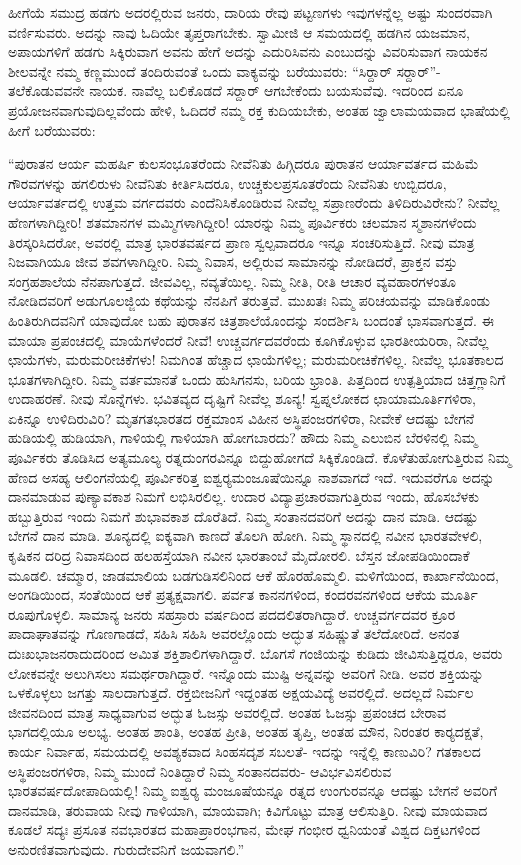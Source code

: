 ಹೀಗೆಯೆ ಸಮುದ್ರ ಹಡಗು ಅದರಲ್ಲಿರುವ ಜನರು, ದಾರಿಯ ರೇವು ಪಟ್ಟಣಗಳು ಇವುಗಳನ್ನೆಲ್ಲ ಅಷ್ಟು ಸುಂದರವಾಗಿ ವರ್ಣಿಸುವರು. ಅದನ್ನು ನಾವು ಓದಿಯೇ ತೃಪ್ತರಾಗಬೇಕು. ಸ್ವಾಮೀಜಿ ಆ ಸಮಯದಲ್ಲಿ ಹಡಗಿನ ಯಜಮಾನ, ಅಪಾಯಗಳಿಗೆ ಹಡಗು ಸಿಕ್ಕಿರುವಾಗ ಅವನು ಹೇಗೆ ಅದನ್ನು ಎದುರಿಸಿವನು ಎಂಬುದನ್ನು ವಿವರಿಸುವಾಗ ನಾಯಕನ ಶೀಲವನ್ನೇ ನಮ್ಮ ಕಣ್ಣಮುಂದೆ ತಂದಿರುವಂತೆ ಒಂದು ವಾಕ್ಯವನ್ನು ಬರೆಯುವರು: “ಸಿರ್‍ದಾರ್ ಸರ್‍ದಾರ್”- ತಲೆಕೊಡುವವನೇ ನಾಯಕ. ನಾವೆಲ್ಲ ಬಲಿಕೊಡದೆ ಸರ್‍ದಾರ್ ಆಗಬೇಕೆಂದು ಬಯಸುವೆವು. ಇದರಿಂದ ಏನೂ ಪ್ರಯೋಜನವಾಗುವುದಿಲ್ಲವೆಂದು ಹೇಳಿ, ಓದಿದರೆ ನಮ್ಮ ರಕ್ತ ಕುದಿಯಬೇಕು, ಅಂತಹ ಜ್ವಾಲಾಮಯವಾದ ಭಾಷೆಯಲ್ಲಿ ಹೀಗೆ ಬರೆಯುವರು: 

 “ಪುರಾತನ ಆರ್ಯ ಮಹರ್ಷಿ ಕುಲಸಂಭೂತರೆಂದು ನೀವೆನಿತು ಹಿಗ್ಗಿದರೂ ಪುರಾತನ ಆರ್ಯಾವರ್ತದ ಮಹಿಮೆ ಗೌರವಗಳನ್ನು ಹಗಲಿರುಳು ನೀವೆನಿತು ಕೀರ್ತಿಸಿದರೂ, ಉಚ್ಚಕುಲಪ್ರಸೂತರೆಂದು ನೀವೆನಿತು ಉಬ್ಬಿದರೂ, ಆರ್ಯಾವರ್ತದಲ್ಲಿ ಉತ್ತಮ ವರ್ಗದವರು ಎಂದೆನಿಸಿಕೊಂಡಿರುವ ನೀವೆಲ್ಲ ಸಪ್ರಾಣರೆಂದು ತಿಳಿದಿರುವಿರೇನು? ನೀವೆಲ್ಲ ಹೆಣಗಳಾಗಿದ್ದೀರಿ! ಶತಮಾನಗಳ ಮಮ್ಮಿಗಳಾಗಿದ್ದೀರಿ! ಯಾರನ್ನು ನಿಮ್ಮ ಪೂರ್ವಿಕರು ಚಲಮಾನ ಸ್ಮಶಾನಗಳೆಂದು ತಿರಸ್ಕರಿಸಿದರೋ, ಅವರಲ್ಲಿ ಮಾತ್ರ ಭಾರತವರ್ಷದ ಪ್ರಾಣ ಸ್ವಲ್ಪವಾದರೂ ಇನ್ನೂ ಸಂಚರಿಸುತ್ತಿದೆ. ನೀವು ಮಾತ್ರ ನಿಜವಾಗಿಯೂ ಜೀವ ಶವಗಳಾಗಿದ್ದೀರಿ. ನಿಮ್ಮ ನಿವಾಸ, ಅಲ್ಲಿರುವ ಸಾಮಾನನ್ನು ನೋಡಿದರೆ, ಪ್ರಾಕ್ತನ ವಸ್ತು ಸಂಗ್ರಹಶಾಲೆಯ ನೆನಪಾಗುತ್ತದೆ. ಜೀವವಿಲ್ಲ, ನವ್ಯತೆಯಿಲ್ಲ. ನಿಮ್ಮ ನೀತಿ, ರೀತಿ ಆಚಾರ ವ್ಯವಹಾರಗಳಂತೂ ನೋಡಿದವರಿಗೆ ಅಡುಗೂಲಜ್ಜಿಯ ಕಥೆಯನ್ನು ನೆನಪಿಗೆ ತರುತ್ತವೆ. ಮುಖತಃ ನಿಮ್ಮ ಪರಿಚಯವನ್ನು ಮಾಡಿಕೊಂಡು ಹಿಂತಿರುಗಿದವನಿಗೆ ಯಾವುದೋ ಬಹು ಪುರಾತನ ಚಿತ್ರಶಾಲೆಯೊಂದನ್ನು ಸಂದರ್ಶಿಸಿ ಬಂದಂತೆ ಭಾಸವಾಗುತ್ತದೆ. ಈ ಮಾಯಾ ಪ್ರಪಂಚದಲ್ಲಿ ಮಾಯೆಗಳೆಂದರೆ ನೀವೆ! ಉಚ್ಚವರ್ಗದವರೆಂದು ಕೂಗಿಕೊಳ್ಳುವ ಭಾರತೀಯರಿರಾ, ನೀವೆಲ್ಲ ಛಾಯೆಗಳು, ಮರುಮರೀಚಿಕೆಗಳು! ನಿಮಗಿಂತ ಹೆಚ್ಚಾದ ಛಾಯೆಗಳಿಲ್ಲ; ಮರುಮರೀಚಿಕೆಗಳಿಲ್ಲ. ನೀವೆಲ್ಲ ಭೂತಕಾಲದ ಭೂತಗಳಾಗಿದ್ದೀರಿ. ನಿಮ್ಮ ವರ್ತಮಾನತೆ ಒಂದು ಹುಸಿಗನಸು, ಬರಿಯ ಭ್ರಾಂತಿ. ಪಿತ್ತದಿಂದ ಉತ್ಪತ್ತಿಯಾದ ಚಿತ್ತಗ್ಲಾನಿಗೆ ಉದಾಹರಣೆ. ನೀವು ಸೊನ್ನೆಗಳು. ಭವಿತವ್ಯದ ದೃಷ್ಟಿಗೆ ನೀವೆಲ್ಲ ಶೂನ್ಯ! ಸ್ವಪ್ನಲೋಕದ ಛಾಯಾಮೂರ್ತಿಗಳಿರಾ, ಏಕಿನ್ನೂ ಉಳಿದಿರುವಿರಿ? ಮೃತಗತಭಾರತದ ರಕ್ತಮಾಂಸ ವಿಹೀನ ಅಸ್ಥಿಪಂಜರಗಳಿರಾ, ನೀವೇಕೆ ಆದಷ್ಟು ಬೇಗನೆ ಹುಡಿಯಲ್ಲಿ ಹುಡಿಯಾಗಿ, ಗಾಳಿಯಲ್ಲಿ ಗಾಳಿಯಾಗಿ ಹೋಗಬಾರದು? ಹೌದು ನಿಮ್ಮ ಎಲುಬಿನ ಬೆರಳಿನಲ್ಲಿ ನಿಮ್ಮ ಪೂರ್ವಿಕರು ತೊಡಿಸಿದ ಅತ್ಯಮೂಲ್ಯ ರತ್ನದುಂಗರವಿನ್ನೂ ಬಿದ್ದುಹೋಗದೆ ಸಿಕ್ಕಿಕೊಂಡಿದೆ. ಕೊಳೆತುಹೋಗುತ್ತಿರುವ ನಿಮ್ಮ ಹೆಣದ ಅಸಹ್ಯ ಆಲಿಂಗನೆಯಲ್ಲಿ ಪೂರ್ವಿಕರಿತ್ತ ಐಶ್ವರ‍್ಯಮಂಜೂಷೆಯಿನ್ನೂ ನಾಶವಾಗದೆ ಇದೆ. ಇದುವರೆಗೂ ಅದನ್ನು ದಾನಮಾಡುವ ಪುಣ್ಯಾವಕಾಶ ನಿಮಗೆ ಲಭಿಸಿರಲಿಲ್ಲ. ಉದಾರ ವಿದ್ಯಾಪ್ರಚಾರವಾಗುತ್ತಿರುವ ಇಂದು, ಹೊಸಬೆಳಕು ಹಬ್ಬುತ್ತಿರುವ ಇಂದು ನಿಮಗೆ ಶುಭಾವಕಾಶ ದೊರೆತಿದೆ. ನಿಮ್ಮ ಸಂತಾನದವರಿಗೆ ಅದನ್ನು ದಾನ ಮಾಡಿ. ಆದಷ್ಟು ಬೇಗನೆ ದಾನ ಮಾಡಿ. ಶೂನ್ಯದಲ್ಲಿ ಐಕ್ಯವಾಗಿ ಕಾಣದೆ ತೊಲಗಿ ಹೋಗಿ. ನಿಮ್ಮ ಸ್ಥಾನದಲ್ಲಿ ನವೀನ ಭಾರತವೇಳಲಿ, ಕೃಷಿಕನ ದರಿದ್ರ ನಿವಾಸದಿಂದ ಹಲಹಸ್ತೆಯಾಗಿ ನವೀನ ಭಾರತಾಂಬೆ ಮೈದೋರಲಿ. ಬೆಸ್ತನ ಜೋಪಡಿಯಿಂದಾಕೆ ಮೂಡಲಿ. ಚಮ್ಮಾರ, ಜಾಡಮಾಲಿಯ ಬಡಗುಡಿಸಲಿನಿಂದ ಆಕೆ ಹೊರಹೊಮ್ಮಲಿ. ಮಳಿಗೆಯಿಂದ, ಕಾರ್ಖಾನೆಯಿಂದ, ಅಂಗಡಿಯಿಂದ, ಸಂತೆಯಿಂದ ಆಕೆ ಪ್ರತ್ಯಕ್ಷವಾಗಲಿ. ಪರ್ವತ ಕಾನನಗಳಿಂದ, ಕಂದರವನಗಳಿಂದ ಆಕೆಯ ಮೂರ್ತಿ ರೂಪುಗೊಳ್ಳಲಿ. ಸಾಮಾನ್ಯ ಜನರು ಸಹಸ್ರಾರು ವರ್ಷದಿಂದ ಪದದಲಿತರಾಗಿದ್ದಾರೆ. ಉಚ್ಚವರ್ಗದವರ ಕ್ರೂರ ಪಾದಾಘಾತವನ್ನು ಗೊಣಗಾಡದೆ, ಸಹಿಸಿ ಸಹಿಸಿ ಅವರಲ್ಲೊಂದು ಅದ್ಭುತ ಸಹಿಷ್ಣುತೆ ತಲೆದೋರಿದೆ. ಅನಂತ ದುಃಖಭಾಜನರಾದುದರಿಂದ ಅಮಿತ ಶಕ್ತಿಶಾಲಿಗಳಾಗಿದ್ದಾರೆ. ಬೊಗಸೆ ಗಂಜಿಯನ್ನು ಕುಡಿದು ಜೀವಿಸುತ್ತಿದ್ದರೂ, ಅವರು ಲೋಕವನ್ನೇ ಅಲುಗಿಸಲು ಸಮರ್ಥರಾಗಿದ್ದಾರೆ. ಇನ್ನೊಂದು ಮುಷ್ಟಿ ಅನ್ನವನ್ನು ಅವರಿಗೆ ನೀಡಿ. ಅವರ ಶಕ್ತಿಯನ್ನು ಒಳಕೊಳ್ಳಲು ಜಗತ್ತು ಸಾಲದಾಗುತ್ತದೆ. ರಕ್ತಬೀಜನಿಗೆ ಇದ್ದಂತಹ ಅಕ್ಷಯವಿದ್ಯೆ ಅವರಲ್ಲಿದೆ. ಅದಲ್ಲದೆ ನಿರ್ಮಲ ಜೀವನದಿಂದ ಮಾತ್ರ ಸಾಧ್ಯವಾಗುವ ಅದ್ಭುತ ಓಜಸ್ಸು ಅವರಲ್ಲಿದೆ. ಅಂತಹ ಓಜಸ್ಸು ಪ್ರಪಂಚದ ಬೇರಾವ ಭಾಗದಲ್ಲಿಯೂ ಅಲಭ್ಯ. ಅಂತಹ ಶಾಂತಿ, ಅಂತಹ ಪ್ರೀತಿ, ಅಂತಹ ತೃಪ್ತಿ, ಅಂತಹ ಮೌನ, ನಿರಂತರ ಕಾರ‍್ಯದಕ್ಷತೆ, ಕಾರ್ಯ ನಿರ್ವಾಹ, ಸಮಯದಲ್ಲಿ ಅವಶ್ಯಕವಾದ ಸಿಂಹಸದೃಶ ಸಬಲತೆ- ಇದನ್ನು ಇನ್ನೆಲ್ಲಿ ಕಾಣುವಿರಿ? ಗತಕಾಲದ ಅಸ್ಥಿಪಂಜರಗಳಿರಾ, ನಿಮ್ಮ ಮುಂದೆ ನಿಂತಿದ್ದಾರೆ ನಿಮ್ಮ ಸಂತಾನದವರು- ಆವಿರ್ಭವಿಸಲಿರುವ ಭಾರತವರ್ಷದೋಪಾದಿಯಲ್ಲಿ! ನಿಮ್ಮ ಐಶ್ವರ‍್ಯ ಮಂಜೂಷೆಯನ್ನೂ ರತ್ನದ ಉಂಗುರವನ್ನೂ ಆದಷ್ಟು ಬೇಗನೆ ಅವರಿಗೆ ದಾನಮಾಡಿ, ತರುವಾಯ ನೀವು ಗಾಳಿಯಾಗಿ, ಮಾಯವಾಗಿ; ಕಿವಿಗೊಟ್ಟು ಮಾತ್ರ ಆಲಿಸುತ್ತಿರಿ. ನೀವು ಮಾಯವಾದ ಕೂಡಲೆ ಸದ್ಯಃ ಪ್ರಸೂತ ನವಭಾರತದ ಮಹಾಪ್ರಾರಂಭಗಾನ, ಮೇಘ ಗಂಭೀರ ಧ್ವನಿಯಂತೆ ವಿಶ್ವದ ದಿಕ್ತಟಗಳಿಂದ ಅನುರಣಿತವಾಗುವುದು. ಗುರುದೇವನಿಗೆ ಜಯವಾಗಲಿ.” 

